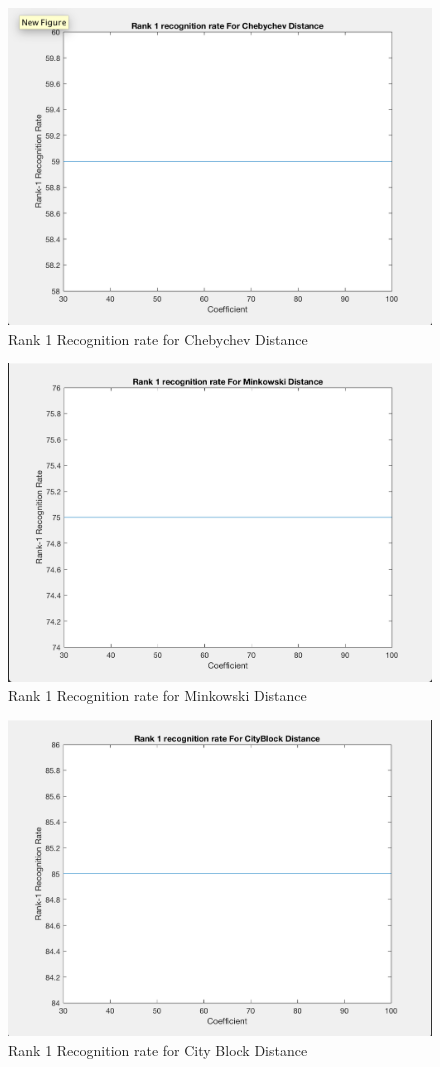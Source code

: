 \documentclass[10pt, letterpaper]{article}
\begin{document}
\begin{figure}
    \includegraphics[width=\linewidth]{images/Rank1Rate_Chebychev}
 \caption{ Rank 1 Recognition rate for Chebychev Distance}
 \label{fig:Rank1Cheby}
\end{figure}

\begin{figure}
    \includegraphics[width=\linewidth]{images/Rank1Rate_Minkowski}
 \caption{ Rank 1 Recognition rate for Minkowski Distance}
 \label{fig:Rank1Min}
\end{figure}

\begin{figure}
    \includegraphics[width=\linewidth]{images/Rank1Rate_CityBlock}
 \caption{ Rank 1 Recognition rate for City Block Distance}
 \label{fig:Rank1CB}
\end{figure}
\end{document}
